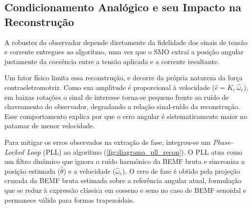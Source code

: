 \subsection{Condicionamento Analógico e seu Impacto na Reconstrução}
\label{sec:condicionamento}

A robustez do observador depende diretamente da fidelidade dos sinais de
tensão e corrente entregues ao algoritmo, uma vez que o SMO extrai a posição
angular justamente da coerência entre a tensão aplicada e a corrente
resultante.

Um fator físico limita essa reconstrução, e decorre da própria natureza da
força contraeletromotriz. Como sua
amplitude é proporcional à velocidade ($\hat{e} = K_e\,\hat{\omega}_e$), em
baixas rotações o sinal de interesse torna-se pequeno frente ao ruído de
chaveamento do observador, degradando a relação sinal-ruído da reconstrução.
Esse comportamento explica por que o erro angular é sistematicamente maior no
patamar de menor velocidade.

Para mitigar os erros observados na extração de fase, integrou-se um
\textit{Phase-Locked Loop} (PLL) ao algoritmo
(\autoref{fig:diagrama_pll_recon}). O PLL atua como um filtro dinâmico que
ignora o ruído harmônico da BEMF bruta e sincroniza a posição estimada
($\hat{\theta}$) e a velocidade ($\hat{\omega}_e$). O erro de fase é obtido
pela projeção cruzada da BEMF bruta estimada sobre a referência angular atual,
formulação que se reduz à expressão clássica em cosseno e seno no caso de BEMF
senoidal e permanece válida para formas trapezoidais.

